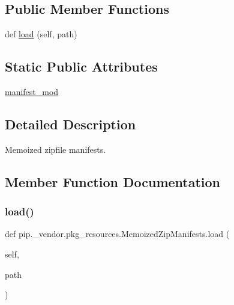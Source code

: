 \subsection*{Public Member Functions}
\begin{DoxyCompactItemize}
\item 
def \hyperlink{classpip_1_1__vendor_1_1pkg__resources_1_1MemoizedZipManifests_ab20afedc63633f10e121b813ee787de5}{load} (self, path)
\end{DoxyCompactItemize}
\subsection*{Static Public Attributes}
\begin{DoxyCompactItemize}
\item 
\hyperlink{classpip_1_1__vendor_1_1pkg__resources_1_1MemoizedZipManifests_a0ab18cfc421068097083100503f8ad3e}{manifest\+\_\+mod}
\end{DoxyCompactItemize}


\subsection{Detailed Description}
\begin{DoxyVerb}Memoized zipfile manifests.
\end{DoxyVerb}
 

\subsection{Member Function Documentation}
\mbox{\label{classpip_1_1__vendor_1_1pkg__resources_1_1MemoizedZipManifests_ab20afedc63633f10e121b813ee787de5}} 
\subsubsection{\texorpdfstring{load()}{load()}}
{\footnotesize\ttfamily def pip.\+\_\+vendor.\+pkg\+\_\+resources.\+Memoized\+Zip\+Manifests.\+load (\begin{DoxyParamCaption}\item[{}]{self,  }\item[{}]{path }\end{DoxyParamCaption})}

